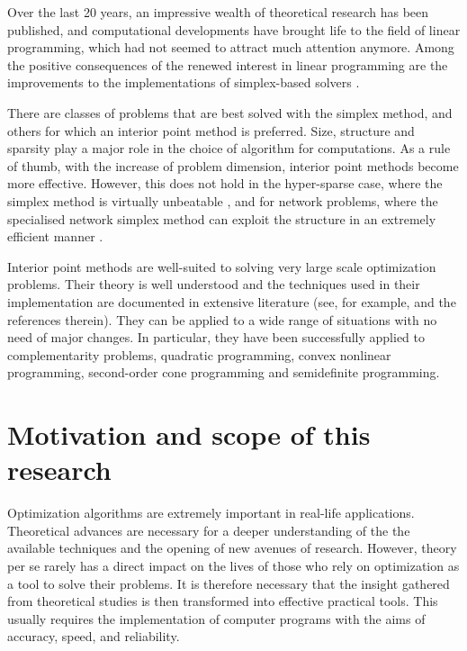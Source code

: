 Over the last 20 years, an impressive wealth of theoretical research
has been published, and computational developments have brought life
to the field of linear programming, which had not seemed to attract much
attention anymore.
Among the positive consequences of the renewed interest in linear
programming are the improvements to the implementations of 
simplex-based solvers \cite{Bixby94,Bixby02}.

There are classes of problems that are best solved with the simplex
method, and others for which an interior point method is preferred.
Size, structure and sparsity play a major role in the choice of
algorithm for computations.
As a rule of thumb, with the increase of problem dimension, 
interior point methods become more effective.
However, this does not hold in the hyper-sparse case, where the
simplex method is virtually unbeatable \cite{Bixby02,HallMcKinnon05}, 
and for network problems,
where the specialised network simplex method can exploit the
structure in an extremely efficient manner \cite{ip:NemhauserWolsey88}.

Interior point methods are well-suited to solving very
large scale optimization problems. Their theory is well understood
\cite{RoosTerlakyVial,ipm:Wright97,Ye97} 
and the techniques used in their implementation 
are documented in extensive literature (see, for example, 
\cite{AndersenGondzioMeszarosXu,GondzioTerlaky,LustigMarstenShanno94} 
and the references therein).
They can be applied to a wide range of situations with no need
of major changes. In particular, they have been successfully applied to
complementarity problems, quadratic programming,
convex nonlinear programming, second-order cone programming and
semidefinite programming.


%
%
\section{Motivation and scope of this research}

Optimization algorithms are extremely important in real-life 
applications. Theoretical advances are necessary for a deeper
understanding of the the available techniques and the opening of new avenues 
of research. 
However, theory per se rarely has a direct impact on the lives 
of those who rely on optimization as a tool to solve their problems.
It is therefore necessary that the insight gathered from
theoretical studies is then transformed into effective practical
tools. This usually requires the implementation of computer programs
with the aims of accuracy, speed, and reliability.

